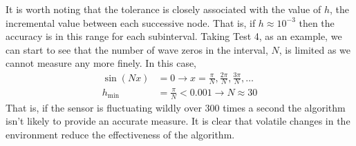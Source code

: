 \documentclass[12pt,a4paper]{report}
\begin{document}
It is worth noting that the tolerance is closely associated with the value of $h$, the incremental value between each successive node.  That is, if $h  \approx 10^{-3}$ then the accuracy is in this range for each subinterval. Taking Test 4, as an example, we can start to see that the number of wave zeros in the interval, $N$, is limited as we cannot measure any more finely. In this case, 
\begin{align*}
	\sin(Nx) &= 0 \to x = \frac{\pi}{N}, \frac{2\pi}{N}, \frac{3\pi}{N}, \dots \\
	h_{\min} &= \frac{\pi}{N} < 0.001 \to N \approx 30
\end{align*}That is, if the sensor is fluctuating wildly over 300 times a second the algorithm isn't likely to provide an accurate measure.  It is clear that volatile changes in the environment reduce the effectiveness of the algorithm.
\end{document}
